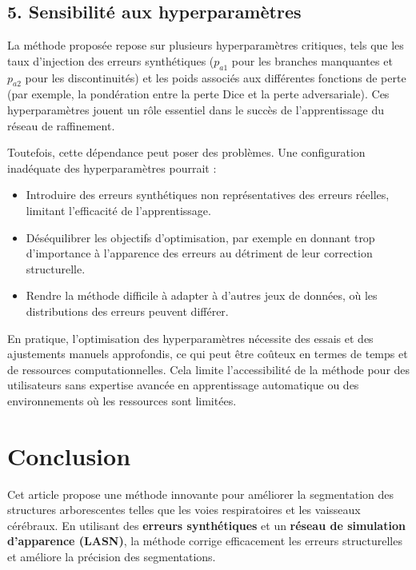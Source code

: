 \documentclass[a4paper,12pt]{article}
\begin{document}
\begin{multicols}{2}
\subsection*{5. Sensibilité aux hyperparamètres}

La méthode proposée repose sur plusieurs hyperparamètres critiques, tels que les taux d'injection des erreurs synthétiques (\(p_{a1}\) pour les branches manquantes et \(p_{a2}\) pour les discontinuités) et les poids associés aux différentes fonctions de perte (par exemple, la pondération entre la perte Dice et la perte adversariale). Ces hyperparamètres jouent un rôle essentiel dans le succès de l'apprentissage du réseau de raffinement.

Toutefois, cette dépendance peut poser des problèmes. Une configuration inadéquate des hyperparamètres pourrait :
\begin{itemize}
    \item Introduire des erreurs synthétiques non représentatives des erreurs réelles, limitant l'efficacité de l'apprentissage.
    \item Déséquilibrer les objectifs d'optimisation, par exemple en donnant trop d'importance à l'apparence des erreurs au détriment de leur correction structurelle.
    \item Rendre la méthode difficile à adapter à d'autres jeux de données, où les distributions des erreurs peuvent différer.
\end{itemize}

En pratique, l'optimisation des hyperparamètres nécessite des essais et des ajustements manuels approfondis, ce qui peut être coûteux en termes de temps et de ressources computationnelles. Cela limite l'accessibilité de la méthode pour des utilisateurs sans expertise avancée en apprentissage automatique ou des environnements où les ressources sont limitées.





\end{multicols}

\section*{Conclusion}

Cet article propose une méthode innovante pour améliorer la segmentation des structures arborescentes telles que les voies respiratoires et les vaisseaux cérébraux. En utilisant des \textbf{erreurs synthétiques} et un \textbf{réseau de simulation d'apparence (LASN)}, la méthode corrige efficacement les erreurs structurelles et améliore la précision des segmentations.
\end{document}

